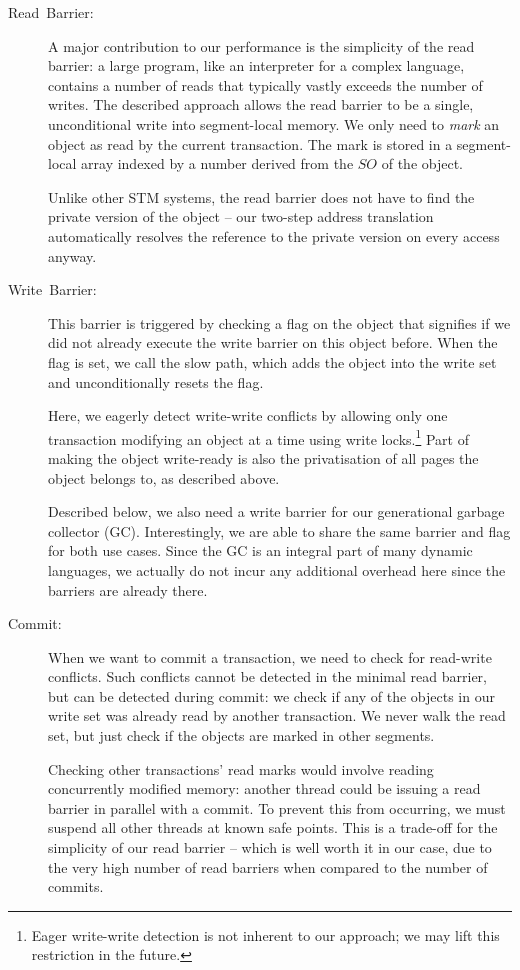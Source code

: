 \documentclass{sigplanconf}
\begin{document}
\begin{description}

\item [{Read~Barrier:}] A major contribution to our performance
  is the simplicity of the read barrier: a large program, like an
  interpreter for a complex language, contains a number of reads that
  typically vastly exceeds the number of writes.  The described
  approach allows the read barrier to be a single, unconditional
  write into segment-local memory. We only need to \emph{mark} an object
  as read by the current transaction. The mark is stored in a
  segment-local array indexed by a number derived from the $SO$
  of the object.

  Unlike other STM systems, the read barrier does not have to find the
  private version of the object -- our two-step address translation
  automatically resolves the reference to the private version on every
  access anyway.

\item [{Write~Barrier:}] This barrier is triggered by checking a flag
  on the object that signifies if we did not already execute the write
  barrier on this object before.  When the flag is set, we call the slow
  path, which adds the object into the write set and unconditionally
  resets the flag.

  Here, we eagerly detect write-write conflicts by allowing only one
  transaction modifying an object at a time using write
  locks.\footnote{Eager write-write detection is not inherent to our
    approach; we may lift this restriction in the future.}  Part of making
  the object write-ready is also the privatisation of all pages the
  object belongs to, as described above.

  Described below, we also need a write barrier for our generational
  garbage collector (GC). Interestingly, we are able to share the same
  barrier and flag for both use cases. Since the GC is an integral
  part of many dynamic languages, we actually do not incur any additional
  overhead here since the barriers are already there.

\item [{Commit:}] When we want to commit a transaction, we need to check
  for read-write conflicts.  Such conflicts cannot be detected in the
  minimal read barrier, but can be detected during commit: we check
  if any of the objects in our write set was already read by another
  transaction. We never walk the read set, but just check if the objects
  are marked in other segments.

  Checking other transactions' read marks would involve reading
  concurrently modified memory: another thread could be issuing a read
  barrier in parallel with a commit.  To prevent this from occurring, we
  must suspend all other threads at known safe points.  This is a
  trade-off for the simplicity of our read barrier -- which is well
  worth it in our case, due to the very high number of read barriers
  when compared to the number of commits.

\end{description}
\end{document}
